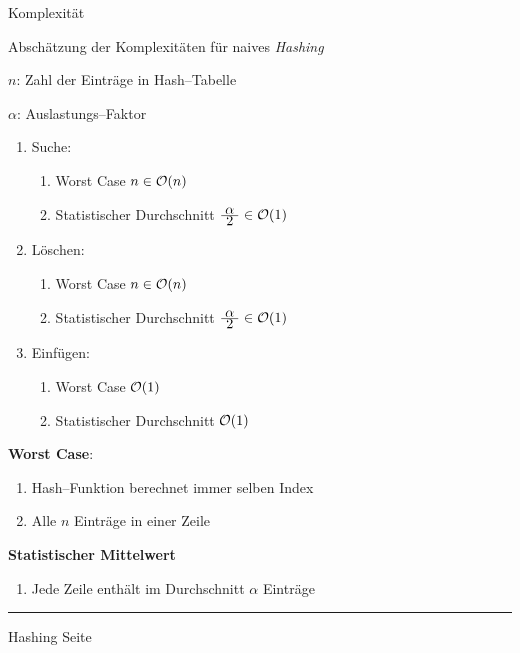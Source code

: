 \begin{slide}{}
\normalsize

\begin{center}
Komplexit\"at 
\end{center}
\vspace*{0.5cm}

\footnotesize
Absch\"atzung der Komplexit\"aten f\"ur naives \emph{Hashing}

$n$: Zahl der Eintr\"age in Hash--Tabelle

$\alpha$: Auslastungs--Faktor
\begin{enumerate}
\item Suche:    
  \begin{enumerate}
  \item Worst Case                 \hspace*{6.0cm} $n \in \mathcal{O}(n)$
  \item Statistischer Durchschnitt \hspace*{1.3cm} $\frac{\displaystyle\;\alpha\;}{\displaystyle\;2\;} \in \mathcal{O}(1)$ 
  \end{enumerate}
\item L\"oschen: 
  \begin{enumerate}
  \item Worst Case                 \hspace*{6.0cm} $n \in \mathcal{O}(n)$
  \item Statistischer Durchschnitt \hspace*{1.3cm} $\frac{\displaystyle\;\alpha\;}{\displaystyle\;2\;} \in \mathcal{O}(1)$ 
  \end{enumerate}
\item Einf\"ugen: \hspace*{1.3cm}   
  \begin{enumerate}
  \item Worst Case                 \hspace*{7.2cm} $\mathcal{O}(1)$
  \item Statistischer Durchschnitt \hspace*{2.9cm} $\mathcal{O}(1)$ 
  \end{enumerate}
\end{enumerate}
\textbf{Worst Case}: 
\begin{enumerate}
\item Hash--Funktion berechnet immer selben Index
\item Alle $n$ Eintr\"age in einer Zeile
\end{enumerate}
\textbf{Statistischer Mittelwert}
\begin{enumerate}
\item Jede Zeile enth\"alt im Durchschnitt $\alpha$ Eintr\"age
\end{enumerate}

\vspace*{\fill}
\tiny \addtocounter{mypage}{1}
\rule{17cm}{1mm}
Hashing  \hspace*{\fill} Seite 
\end{slide}

